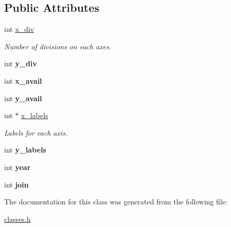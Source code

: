 \subsection*{Public Attributes}
\begin{DoxyCompactItemize}
\item 
\hypertarget{classGraph_afe133cc33b87353c3214cc87ed4e13a1}{
int \hyperlink{classGraph_afe133cc33b87353c3214cc87ed4e13a1}{x\_\-div}}
\label{classGraph_afe133cc33b87353c3214cc87ed4e13a1}

\begin{DoxyCompactList}\small\item\em Number of divisions on each axes. \item\end{DoxyCompactList}\item 
\hypertarget{classGraph_a987324753b4dd07f29ab316cc0b936b8}{
int {\bfseries y\_\-div}}
\label{classGraph_a987324753b4dd07f29ab316cc0b936b8}

\item 
\hypertarget{classGraph_ab92f0b2899b3b26d00bee780885f84ac}{
int {\bfseries x\_\-avail}}
\label{classGraph_ab92f0b2899b3b26d00bee780885f84ac}

\item 
\hypertarget{classGraph_af6af17cb500e1a2507ab8876cc7b8e10}{
int {\bfseries y\_\-avail}}
\label{classGraph_af6af17cb500e1a2507ab8876cc7b8e10}

\item 
\hypertarget{classGraph_ac3b302755470c4a41222a02d2316d659}{
int $\ast$ \hyperlink{classGraph_ac3b302755470c4a41222a02d2316d659}{x\_\-labels}}
\label{classGraph_ac3b302755470c4a41222a02d2316d659}

\begin{DoxyCompactList}\small\item\em Labels for each axis. \item\end{DoxyCompactList}\item 
\hypertarget{classGraph_a01465c6a7e9ae4b0143f31325d713321}{
int {\bfseries y\_\-labels}}
\label{classGraph_a01465c6a7e9ae4b0143f31325d713321}

\item 
\hypertarget{classGraph_a8ca068ea6dfa2f37179c39b1e2d6d3bd}{
int {\bfseries year}}
\label{classGraph_a8ca068ea6dfa2f37179c39b1e2d6d3bd}

\item 
\hypertarget{classGraph_a3950fd68a8380e308351362485da55a4}{
int {\bfseries join}}
\label{classGraph_a3950fd68a8380e308351362485da55a4}

\end{DoxyCompactItemize}


The documentation for this class was generated from the following file:\begin{DoxyCompactItemize}
\item 
\hyperlink{classes_8h}{classes.h}\end{DoxyCompactItemize}

